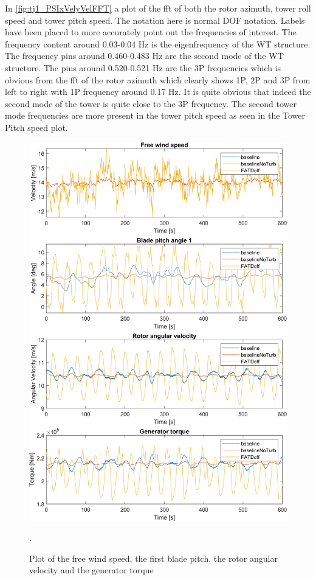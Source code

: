 In \cref{fig:tj1_PSIxVelyVelFFT} a plot of the fft of both the rotor azimuth, tower roll speed and tower pitch speed. The notation here is normal DOF notation. Labels have been placed to more accurately point out the frequencies of interest. The frequency content around 0.03-0.04 Hz is the eigenfrequency of the WT structure. The frequency pins around 0.460-0.483 Hz are the second mode of the WT structure. The pins around 0.520-0.521 Hz are the 3P frequencies which is obvious from the fft of the rotor azimuth which clearly shows 1P, 2P and 3P from left to right with 1P frequency around 0.17 Hz. It is quite obvious that indeed the second mode of the tower is quite close to the 3P frequency. The second tower mode frequencies are more present in the tower pitch speed as seen in the Tower Pitch speed plot.

\begin{figure}[ht]
	\centering
	\includegraphics[width=0.8\linewidth]{Graphics/TestResults/tj01/VfreeToMgen.png}
	\caption{Plot of the free wind speed, the first blade pitch, the rotor angular velocity and the generator torque}.
	\label{fig:tj1:vfreetomgen}
\end{figure}

